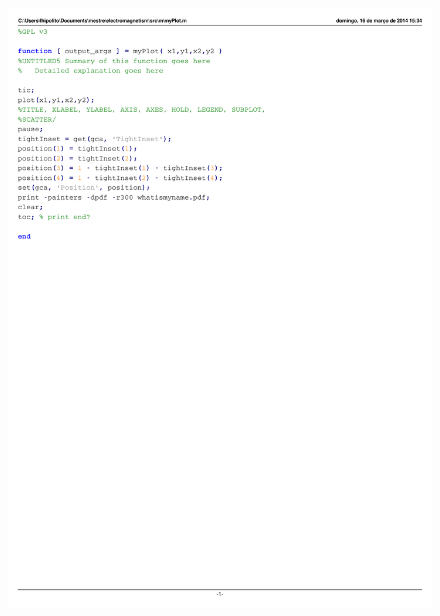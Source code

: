 \documentclass{IEEEtran}
\begin{document}
\begin{figure}
	\centering
	\includegraphics{myPlot.pdf}
	\label{myPlot}
\end{figure}
\end{document}
